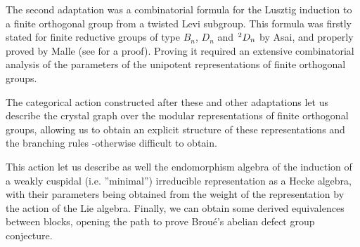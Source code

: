\documentclass[a4paper,twoside,12pt]{article}
\theoremstyle{tdp}
\theoremstyle{ddp}
\theoremstyle{not}
\begin{document}
The second adaptation was a combinatorial formula for the Lusztig induction to a finite orthogonal group from a twisted Levi subgroup. This formula was firstly stated for finite reductive groups of type $B_n$, $D_n$ and $\tensor*[^2]{}{}D_n$ by Asai, and properly proved by Malle (see \cite[\S 4.6]{GeMa} for a proof). %
Proving it required an extensive combinatorial analysis of the parameters of the unipotent representations of finite orthogonal groups.


The categorical action constructed after these and other adaptations let us describe the crystal graph over the modular representations of finite orthogonal groups, allowing us to obtain an explicit structure of these representations and the branching rules -otherwise difficult to obtain. %

This action let us describe as well the endomorphism algebra of the induction of a weakly cuspidal (i.e. ''minimal'') irreducible representation as a Hecke algebra, with their parameters being obtained from the weight of the representation by the action of the Lie algebra. Finally, we can obtain some derived equivalences between blocks, opening the path to prove Broué's abelian defect group conjecture.



\end{document}
